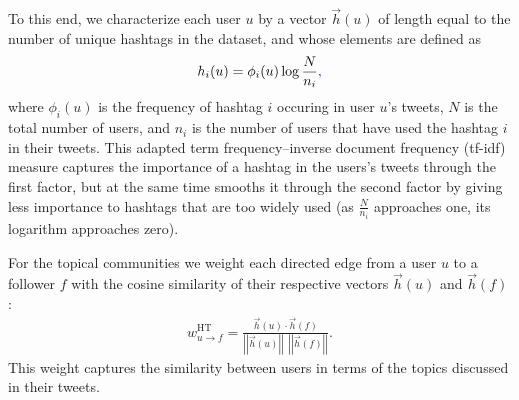 To this end, we characterize each user $u$ by a vector $\vec{h}(u)$ of length equal to the number of unique hashtags in the dataset, and whose elements are defined as
\begin{equation}
h_i(u) = \phi_i(u)\log{ \frac{N}{n_i} }\DIFaddbegin \DIFadd{,
}\DIFaddend \end{equation}
where $\phi_i(u)$ is the frequency of hashtag $i$ occuring in user $u$'s tweets, $N$ is the total number of users, and $n_i$ is the number of users that have used the hashtag $i$ in their tweets. This adapted term frequency--inverse document frequency (tf-idf) measure \cite{salton_introduction_1983} captures the importance of a hashtag in the users's tweets through the first factor, but at the same time smooths it through the second factor by giving less importance to hashtags that are too widely used (as $\frac{N}{n_i}$ approaches one, its logarithm approaches zero). 

For the topical communities we weight each directed edge from a user $u$ to a follower $f$ with the cosine similarity of their respective vectors $\vec{h}(u)$ and $\vec{h}(f)$:
\begin{align}
	w_{u \to f}^{\text{HT}} = \frac{\vec{h}(u) \cdot \vec{h}(f)}{\left|\left|\vec{h}(u)\right|\right| \ \ \left|\left|\vec{h}(f)\right|\right|}. \label{Eqn-EW-topic}
\end{align}
This weight captures the similarity between users in terms of the topics discussed in their tweets. 
\DIFaddbegin 


\subsection{}
\label{sec:method-interaction}

